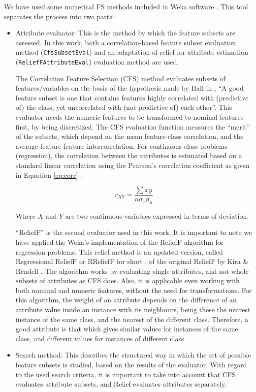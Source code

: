 \documentclass[a4paper,10pt,twocolumn,preprint,3p]{elsarticle}
\begin{document}
We have used some numerical FS methods included in Weka software \cite{Hall2009,Witten2011}. This tool separates the process into two parts:

\begin{itemize}
  \item Attribute evaluator: This is the method by which the feature subsets are assessed. In this work, both a correlation-based feature subset evaluation method ({\tt CfsSubsetEval}) and an adaptation of relief for attribute estimation ({\tt ReliefFAttributeEval}) evaluation method are used. 
  
  The Correlation Feature Selection (CFS) method evaluates subsets of features/variables on the basis of the hypothesis made by Hall in \cite{Hall1998}, ``A  good  feature  subset  is  one  that  contains  features  highly  correlated  with
(predictive of) the class, yet uncorrelated with (not predictive of) each other''. This evaluator needs the numeric features to be transformed to nominal features first, by being discretized.%
 The CFS evaluation function measures the ``merit'' of the subsets, which depend on the mean feature-class correlation, and the average feature-feature intercorrelation. For continuous class problems (regression), the correlation between the attributes is estimated based on a standard linear correlation
using the Pearson's correlation coefficient as given in Equation \ref{eq:corr} \cite{hall2000correlation}. 

\begin{equation}
r_{XY}=\frac{\sum xy}{n\sigma_{x}\sigma_{y}}
\label{eq:corr}
\end{equation}


Where $X$ and $Y$ are two continuous variables expressed in terms
of deviation. 

``ReliefF'' is the second evaluator used in this work. It is important to note 
we have applied the Weka's implementation of the ReliefF algorithm for regression problems. This relief method is an updated version, called Regressional ReliefF or RReliefF for short \cite{RobnikSikonja1997}, of the original ReliefF by Kira \& Rendell \cite{Kira1992}. The algorithm works by evaluating single attributes, and not whole subsets of attributes as CFS does. Also, it is applicable even working with both nominal and numeric features, without the need for transformations. For this algorithm, the weight of an attribute depends on the difference of an attribute value inside an instance with its neighbours, being these the nearest instance of the same class, and the nearest of the different class. Therefore, a good attribute is that which gives similar values for instances of the same class, and different values for instances of different class.
  \item Search method: This describes the structured way in which the set of possible feature subsets is studied, based on the results of the evaluator. With regard to the used search criteria, it is important to take into account that CFS evaluates attribute subsets, and Relief evaluates attributes separately.


\end{itemize}
\end{document}

